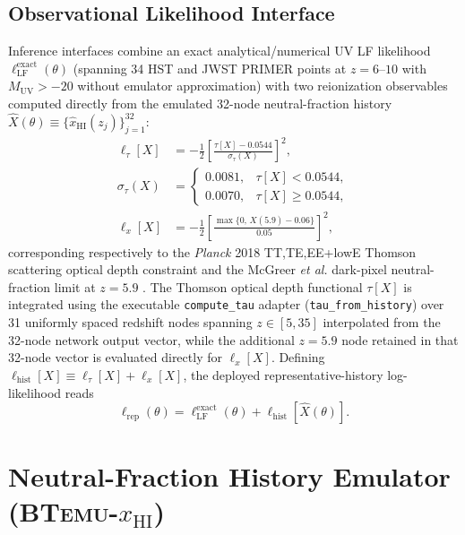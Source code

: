 \documentclass[aps,prd,reprint,superscriptaddress,nofootinbib,amsmath,amssymb,floatfix,longbibliography]{revtex4-2}
\begin{document}
\subsection{Observational Likelihood Interface}\label{sec:likelihood}

Inference interfaces combine an exact analytical/numerical UV LF likelihood $\ell_{\mathrm{LF}}^{\mathrm{exact}}(\theta)$ (spanning 34 HST \cite{Bouwens2015,Bouwens2017} and JWST \textsc{PRIMER} \cite{Donnan2024} points at $z=6\text{--}10$ with $M_{\mathrm{UV}} > -20$ without emulator approximation) with two reionization observables computed directly from the emulated 32-node neutral-fraction history $\widehat{X}(\theta) \equiv \{\widehat{x}_{\mathrm{HI}}(z_j)\}_{j=1}^{32}$:
\begin{align}
\ell_{\tau}[X] &= -\frac{1}{2}\left[\frac{\tau[X] - 0.0544}{\sigma_{\tau}(X)}\right]^2,\nonumber\\
\sigma_\tau(X) &= \begin{cases} 0.0081, & \tau[X] < 0.0544,\\ 0.0070, & \tau[X] \ge 0.0544, \end{cases}\\
\ell_x[X] &= -\frac{1}{2}\left[\frac{\max\{0,\, X(5.9) - 0.06\}}{0.05}\right]^2,
\end{align}
corresponding respectively to the \textit{Planck} 2018 TT,TE,EE+lowE Thomson scattering optical depth constraint \cite{Planck2018} and the McGreer \textit{et al.} dark-pixel neutral-fraction limit at $z=5.9$ \cite{McGreer2015}. The Thomson optical depth functional $\tau[X]$ is integrated using the executable \texttt{compute\_tau} adapter (\texttt{tau\_from\_history}) over 31 uniformly spaced redshift nodes spanning $z \in [5, 35]$ interpolated from the 32-node network output vector, while the additional $z=5.9$ node retained in that 32-node vector is evaluated directly for $\ell_x[X]$. Defining $\ell_{\mathrm{hist}}[X] \equiv \ell_{\tau}[X] + \ell_x[X]$, the deployed representative-history log-likelihood reads
\begin{equation}
\ell_{\mathrm{rep}}(\theta) = \ell_{\mathrm{LF}}^{\mathrm{exact}}(\theta) + \ell_{\mathrm{hist}}[\widehat{X}(\theta)].
\label{eq:lrep}
\end{equation}

\section{Neutral-Fraction History Emulator (\texorpdfstring{\textsc{BTemu}-$x_{\mathrm{HI}}$}{BTemu-xHI})}\label{sec:history}
\end{document}
